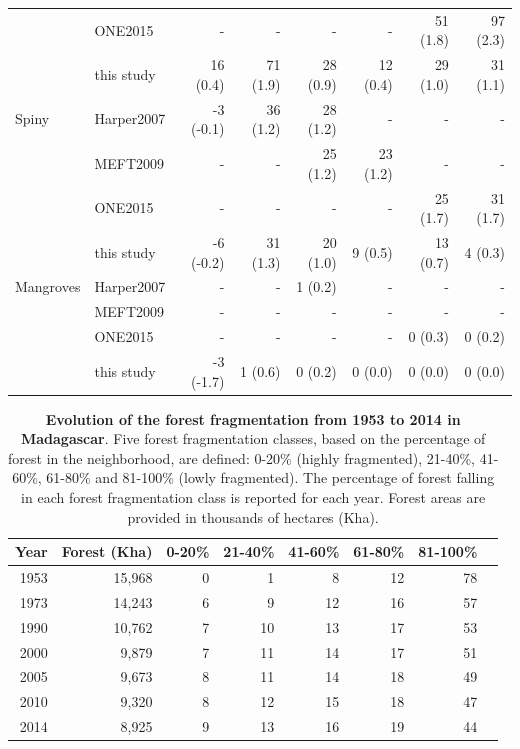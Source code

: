\documentclass[a4paper, 12pt, leqno]{article}\usepackage[]{graphicx}\usepackage[]{color}
\begin{document}
\begin{table}[!h]
\begin{tabular}[t]{llrrrrrr}
 & ONE2015 & - & - & - & - & 51 (1.8) & 97 (2.3)\\
 & this study & 16 (0.4) & 71 (1.9) & 28 (0.9) & 12 (0.4) & 29 (1.0) & 31 (1.1)\\
Spiny & Harper2007 & -3 (-0.1) & 36 (1.2) & 28 (1.2) & - & - & -\\
 & MEFT2009 & - & - & 25 (1.2) & 23 (1.2) & - & -\\
 & ONE2015 & - & - & - & - & 25 (1.7) & 31 (1.7)\\
 & this study & -6 (-0.2) & 31 (1.3) & 20 (1.0) & 9 (0.5) & 13 (0.7) & 4 (0.3)\\
Mangroves & Harper2007 & - & - & 1 (0.2) & - & - & -\\
 & MEFT2009 & - & - & - & - & - & -\\
 & ONE2015 & - & - & - & - & 0 (0.3) & 0 (0.2)\\
 & this study & -3 (-1.7) & 1 (0.6) & 0 (0.2) & 0 (0.0) & 0 (0.0) & 0 (0.0)\\
\bottomrule
\end{tabular}
\end{table}



\newpage

\begin{table}[!h]

  \begin{longtable}[]{@{}rrrrrrrr@{}}
    \toprule
    Year & Forest (Kha) & 0-20\% & 21-40\% & 41-60\% &
    61-80\% & 81-100\% \\
    \midrule
    \endhead
    1953  & 15,968  & 0  & 1  & 8  & 12  & 78 \\
    1973  & 14,243  & 6  & 9  & 12  & 16  & 57 \\
    1990  & 10,762  & 7  & 10  & 13  & 17  & 53 \\
    2000  & 9,879  & 7  & 11  & 14  & 17  & 51 \\
    2005  & 9,673  & 8  & 11  & 14  & 18  & 49 \\
    2010  & 9,320  & 8  & 12  & 15  & 18  & 47 \\
    2014  & 8,925  & 9  & 13  & 16  & 19  & 44 \\
    \bottomrule
  \end{longtable}%
  \addtocounter{table}{-1}

  \caption{\textbf{Evolution of the forest fragmentation from 1953 to
      2014 in Madagascar}. Five forest fragmentation classes, based on
    the percentage of forest in the neighborhood, are defined: 0-20\%
    (highly fragmented), 21-40\%, 41-60\%, 61-80\% and 81-100\% (lowly
    fragmented). The percentage of forest falling in each forest
    fragmentation class is reported for each year. Forest areas are
    provided in thousands of hectares (Kha).}

  \label{tab:frag}
\end{table}
\end{document}
